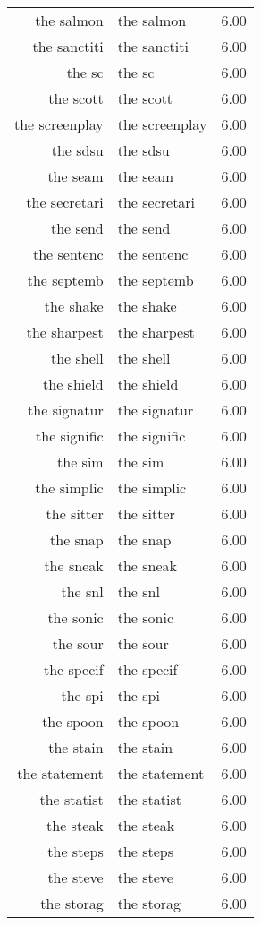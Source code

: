 \begin{table}[ht]
\begin{tabular}{rlr}
  the salmon & the salmon & 6.00 \\ 
  the sanctiti & the sanctiti & 6.00 \\ 
  the sc & the sc & 6.00 \\ 
  the scott & the scott & 6.00 \\ 
  the screenplay & the screenplay & 6.00 \\ 
  the sdsu & the sdsu & 6.00 \\ 
  the seam & the seam & 6.00 \\ 
  the secretari & the secretari & 6.00 \\ 
  the send & the send & 6.00 \\ 
  the sentenc & the sentenc & 6.00 \\ 
  the septemb & the septemb & 6.00 \\ 
  the shake & the shake & 6.00 \\ 
  the sharpest & the sharpest & 6.00 \\ 
  the shell & the shell & 6.00 \\ 
  the shield & the shield & 6.00 \\ 
  the signatur & the signatur & 6.00 \\ 
  the signific & the signific & 6.00 \\ 
  the sim & the sim & 6.00 \\ 
  the simplic & the simplic & 6.00 \\ 
  the sitter & the sitter & 6.00 \\ 
  the snap & the snap & 6.00 \\ 
  the sneak & the sneak & 6.00 \\ 
  the snl & the snl & 6.00 \\ 
  the sonic & the sonic & 6.00 \\ 
  the sour & the sour & 6.00 \\ 
  the specif & the specif & 6.00 \\ 
  the spi & the spi & 6.00 \\ 
  the spoon & the spoon & 6.00 \\ 
  the stain & the stain & 6.00 \\ 
  the statement & the statement & 6.00 \\ 
  the statist & the statist & 6.00 \\ 
  the steak & the steak & 6.00 \\ 
  the steps & the steps & 6.00 \\ 
  the steve & the steve & 6.00 \\ 
  the storag & the storag & 6.00 \\ 

\end{tabular}
\end{table}
